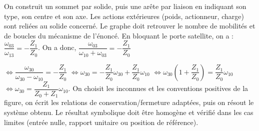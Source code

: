 \begin{corrigebox}
On construit un sommet par solide, puis une arête par liaison en
        indiquant son type, son centre et son axe. Les actions extérieures (poids,
        actionneur, charge) sont reliées au solide concerné. Le graphe doit retrouver le
        nombre de mobilités et de boucles du mécanisme de l'énoncé.
En bloquant le porte satellite, on a : $\dfrac{\omega_{03}}{\omega_{13}}=-\dfrac{Z_1}{Z_0}$. On a donc, 
$\dfrac{\omega_{03}}{\omega_{10}+\omega_{03}}=-\dfrac{Z_1}{Z_0}$

$\Leftrightarrow \dfrac{\omega_{30}}{\omega_{30}-\omega_{10}}=-\dfrac{Z_1}{Z_0}$
$\Leftrightarrow \omega_{30}=-\dfrac{Z_1}{Z_0} \omega_{30}+\dfrac{Z_1}{Z_0}\omega_{10} $
$\Leftrightarrow \omega_{30}\left( 1+\dfrac{Z_1}{Z_0} \right)=\dfrac{Z_1}{Z_0}\omega_{10} $
$\Leftrightarrow \omega_{30}=\dfrac{Z_1}{Z_0+Z_1}\omega_{10} $.
On choisit les inconnues et les conventions positives de la figure,
        on écrit les relations de conservation/fermeture adaptées, puis on résout le
        système obtenu. Le résultat symbolique doit être homogène et vérifié dans les cas
        limites (entrée nulle, rapport unitaire ou position de référence).
\end{corrigebox}
